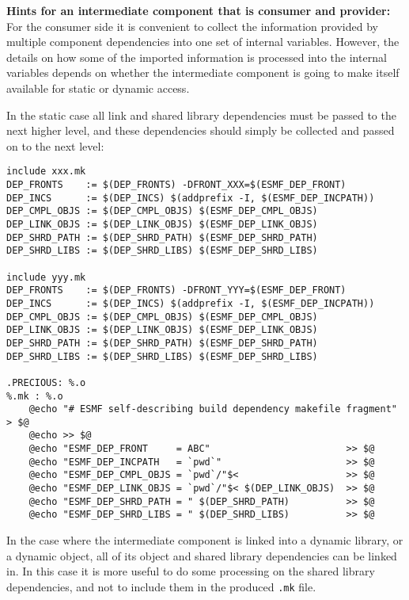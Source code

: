 {\bf Hints for an intermediate component that is consumer and provider:} For the consumer side it is convenient to collect the information provided by multiple component dependencies into one set of internal variables. However, the details on how some of the imported information is processed into the internal variables depends on whether the intermediate component is going to make itself available for static or dynamic access.

In the static case all link and shared library dependencies must be passed to the next higher level, and these dependencies should simply be collected and passed on to the next level:

\begin{verbatim}
include xxx.mk
DEP_FRONTS    := $(DEP_FRONTS) -DFRONT_XXX=$(ESMF_DEP_FRONT)
DEP_INCS      := $(DEP_INCS) $(addprefix -I, $(ESMF_DEP_INCPATH))
DEP_CMPL_OBJS := $(DEP_CMPL_OBJS) $(ESMF_DEP_CMPL_OBJS)
DEP_LINK_OBJS := $(DEP_LINK_OBJS) $(ESMF_DEP_LINK_OBJS)
DEP_SHRD_PATH := $(DEP_SHRD_PATH) $(ESMF_DEP_SHRD_PATH)
DEP_SHRD_LIBS := $(DEP_SHRD_LIBS) $(ESMF_DEP_SHRD_LIBS)

include yyy.mk
DEP_FRONTS    := $(DEP_FRONTS) -DFRONT_YYY=$(ESMF_DEP_FRONT)
DEP_INCS      := $(DEP_INCS) $(addprefix -I, $(ESMF_DEP_INCPATH))
DEP_CMPL_OBJS := $(DEP_CMPL_OBJS) $(ESMF_DEP_CMPL_OBJS)
DEP_LINK_OBJS := $(DEP_LINK_OBJS) $(ESMF_DEP_LINK_OBJS)
DEP_SHRD_PATH := $(DEP_SHRD_PATH) $(ESMF_DEP_SHRD_PATH)
DEP_SHRD_LIBS := $(DEP_SHRD_LIBS) $(ESMF_DEP_SHRD_LIBS)

.PRECIOUS: %.o
%.mk : %.o
	@echo "# ESMF self-describing build dependency makefile fragment" > $@
	@echo >> $@
	@echo "ESMF_DEP_FRONT     = ABC"                        >> $@
	@echo "ESMF_DEP_INCPATH   = `pwd`"                      >> $@
	@echo "ESMF_DEP_CMPL_OBJS = `pwd`/"$<                   >> $@
	@echo "ESMF_DEP_LINK_OBJS = `pwd`/"$< $(DEP_LINK_OBJS)  >> $@
	@echo "ESMF_DEP_SHRD_PATH = " $(DEP_SHRD_PATH)          >> $@
	@echo "ESMF_DEP_SHRD_LIBS = " $(DEP_SHRD_LIBS)          >> $@
\end{verbatim}

In the case where the intermediate component is linked into a dynamic library, or a dynamic object, all of its object and shared library dependencies can be linked in. In this case it is more useful to do some processing on the shared library dependencies, and not to include them in the produced {\tt .mk} file.

